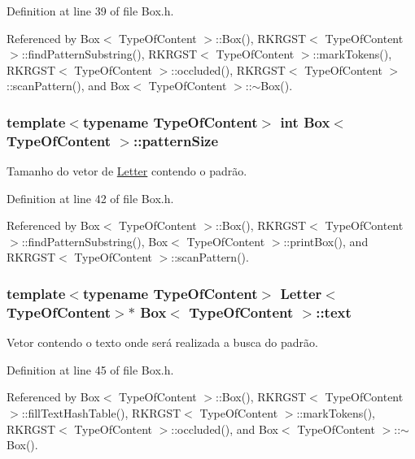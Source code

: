 Definition at line 39 of file Box.\+h.



Referenced by Box$<$ Type\+Of\+Content $>$\+::\+Box(), R\+K\+R\+G\+S\+T$<$ Type\+Of\+Content $>$\+::find\+Pattern\+Substring(), R\+K\+R\+G\+S\+T$<$ Type\+Of\+Content $>$\+::mark\+Tokens(), R\+K\+R\+G\+S\+T$<$ Type\+Of\+Content $>$\+::occluded(), R\+K\+R\+G\+S\+T$<$ Type\+Of\+Content $>$\+::scan\+Pattern(), and Box$<$ Type\+Of\+Content $>$\+::$\sim$\+Box().

\hypertarget{classBox_acadd4d6b43a90560a093cb64aa77b7e9}{
\subsubsection[{pattern\+Size}]{\setlength{\rightskip}{0pt plus 5cm}template$<$typename Type\+Of\+Content$>$ int {\bf Box}$<$ Type\+Of\+Content $>$\+::pattern\+Size}}\label{classBox_acadd4d6b43a90560a093cb64aa77b7e9}


Tamanho do vetor de \hyperlink{classLetter}{Letter} contendo o padrão. 



Definition at line 42 of file Box.\+h.



Referenced by Box$<$ Type\+Of\+Content $>$\+::\+Box(), R\+K\+R\+G\+S\+T$<$ Type\+Of\+Content $>$\+::find\+Pattern\+Substring(), Box$<$ Type\+Of\+Content $>$\+::print\+Box(), and R\+K\+R\+G\+S\+T$<$ Type\+Of\+Content $>$\+::scan\+Pattern().

\hypertarget{classBox_a5c23fcbcde78ac65c62127c2b272ac30}{
\subsubsection[{text}]{\setlength{\rightskip}{0pt plus 5cm}template$<$typename Type\+Of\+Content$>$ {\bf Letter}$<$Type\+Of\+Content$>$$\ast$ {\bf Box}$<$ Type\+Of\+Content $>$\+::text}}\label{classBox_a5c23fcbcde78ac65c62127c2b272ac30}


Vetor contendo o texto onde será realizada a busca do padrão. 



Definition at line 45 of file Box.\+h.



Referenced by Box$<$ Type\+Of\+Content $>$\+::\+Box(), R\+K\+R\+G\+S\+T$<$ Type\+Of\+Content $>$\+::fill\+Text\+Hash\+Table(), R\+K\+R\+G\+S\+T$<$ Type\+Of\+Content $>$\+::mark\+Tokens(), R\+K\+R\+G\+S\+T$<$ Type\+Of\+Content $>$\+::occluded(), and Box$<$ Type\+Of\+Content $>$\+::$\sim$\+Box().

